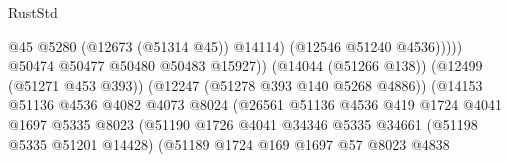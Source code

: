 \begin{lexlean}{RustStd}
\begin{coremodule}
{\begin{coremodule}
{{{{{{{{{{{{{{{{{{{{{{{{{{{{{{{{{{{{{{{{{{{{{{{{{{{{{{{{{{{{{{{{{{{{{{{{{{{{{{{{                                                              @45
                                                              @5280
                                                              (@12673 (@51314 @45))
                                                              @14114)
                                                            (@12546 @51240 @4536)))))
                                                    @50474
                                                    @50477
                                                    @50480
                                                    @50483
                                                    @15927))
                                                (@14044 (@51266 @138))
                                                (@12499 (@51271 @453 @393))
                                                (@12247 (@51278 @393 @140 @5268 @4886))
                                                (@14153
                                                  @51136
                                                  @4536
                                                  @4082
                                                  @4073
                                                  @8024
                                                  (@26561
                                                    @51136
                                                    @4536
                                                    @419
                                                    @1724
                                                    @4041
                                                    @1697
                                                    @5335
                                                    @8023
                                                    (@51190
                                                      @1726
                                                      @4041
                                                      @34346
                                                      @5335
                                                      @34661
                                                      (@51198 @5335 @51201 @14428)
                                                      (@51189
                                                        @1724
                                                        @169
                                                        @1697
                                                        @57
                                                        @8023
                                                        @4838
}}}}}}}}}}}}}}}}}}}}}}}}}}}}}}}}}}}}}}}}}}}}}}}}}}}}}}}}}}}}}}}}}}}}}}}}}}}}}}}}
\end{coremodule}}
\end{coremodule}
\end{lexlean}
